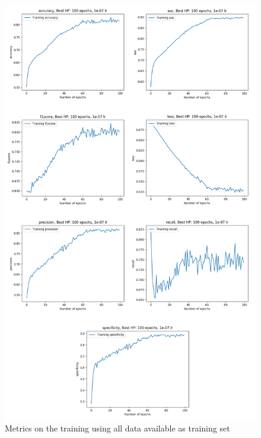\begin{figure}[!h]
\centering
\includegraphics[width=1\textwidth, keepaspectratio=true]{./figures/paper_reproduction_results_challenge_full_dataset.png}
\caption{Metrics on the training using all data available as training set}
\label{fig:challenge_all_results_experiment}
\end{figure}

\begin{table}[]
\caption{AUC of the model saved at different epochs on the official SPIE-AAPM-NCI Prostate MR classification test set }
\label{fig:results_for_all_models_challenge}
\end{table}

